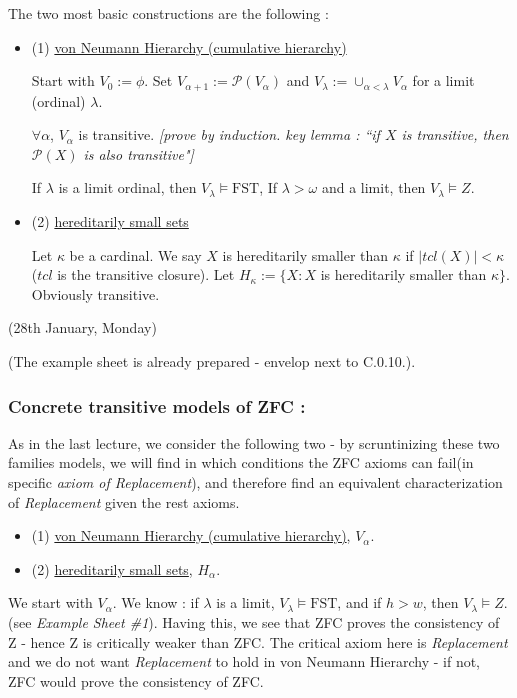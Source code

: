 \documentclass[12pt,a4paper]{article}
\renewenvironment{i}
{\begin{itemize} 
	}%
	{\end{itemize}
}
\begin{document}
\quad The two most basic constructions are the following :
\begin{i}
\item[(1)] \underline{von Neumann Hierarchy (cumulative hierarchy)}

Start with $V_0 := \phi$. Set $V_{\alpha+1} := \mathscr{P}(V_{\alpha})$ and $V_{\lambda} := \cup_{\alpha< \lambda} V_{\alpha}$ for a limit (ordinal) $\lambda$.
\s

\prop $\forall \alpha$, $V_{\alpha}$ is transitive. \emph{[prove by induction. key lemma : ``if $X$ is transitive, then $\mathscr{P}(X)$ is also transitive"]}

If $\lambda$ is a limit ordinal, then $V_{\lambda} \models \text{FST}$, If $\lambda > \omega$ and a limit, then $V_{\lambda}\models Z$.

\item[(2)] \underline{hereditarily small sets}

Let $\kappa$ be a cardinal. We say $X$ is hereditarily smaller than $\kappa$ if $|tcl(X)| < \kappa$ ($tcl$ is the transitive closure). Let $H_{\kappa} := \{X:X$ is hereditarily smaller than $\kappa \}$. Obviously transitive.
\end{i}
\s

\newday

(28th January, Monday)
\s

(The example sheet is already prepared - envelop next to C.0.10.).

\s
\subsubsection*{Concrete transitive models of ZFC :}

As in the last lecture, we consider the following two - by scruntinizing these two families models, we will find in which conditions the ZFC axioms can fail(in specific \emph{axiom of Replacement}), and therefore find an equivalent characterization of \emph{Replacement} given the rest axioms.
\begin{i}
\item[(1)] \underline{von Neumann Hierarchy (cumulative hierarchy)}, $V_{\alpha}$.

\item[(2)] \underline{hereditarily small sets}, $H_{\alpha}$.
\end{i}
We start with $V_{\alpha}$. We know : if $\lambda$ is a limit, $V_{\lambda} \models \text{FST}$, and if $h>w$, then $V_{\lambda} \models Z$. (see \emph{Example Sheet \#1}). Having this, we see that ZFC proves the consistency of Z - hence Z is critically weaker than ZFC. The critical axiom here is \emph{Replacement} and we do not want \emph{Replacement} to hold in von Neumann Hierarchy - if not, ZFC would prove the consistency of ZFC.
\end{document}
